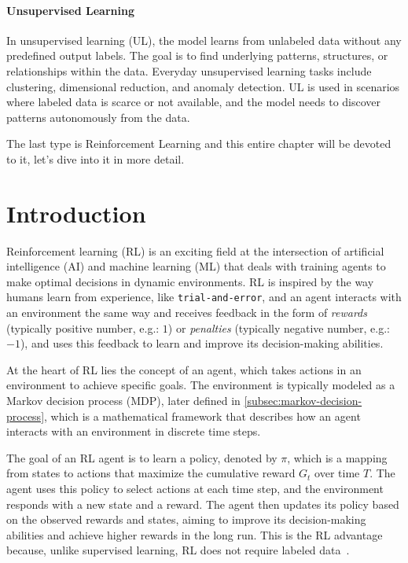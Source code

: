 \documentclass[../xlapes02]{subfiles}
\begin{document}
    \paragraph{Unsupervised Learning}
    In unsupervised learning (UL), the model learns from unlabeled data without any predefined output labels. The goal is to find underlying patterns, structures, or relationships within the data. Everyday unsupervised learning tasks include clustering, dimensional reduction, and anomaly detection. UL is used in scenarios where labeled data is scarce or not available, and the model needs to discover patterns autonomously from the data.

    The last type is Reinforcement Learning and this entire chapter will be devoted to it, let's dive into it in more detail.


    \section{Introduction}\label{sec:rl-introduction}
    Reinforcement learning (RL) is an exciting field at the intersection of artificial intelligence (AI) and machine learning (ML) that deals with training agents to make optimal decisions in dynamic environments. RL is inspired by the way humans learn from experience, like \texttt{trial-and-error}, and an agent interacts with an environment the same way and receives feedback in the form of \emph{rewards} (typically positive number, e.g.: $1$) or \emph{penalties} (typically negative number, e.g.: $-1$), and uses this feedback to learn and improve its decision-making abilities.

    At the heart of RL lies the concept of an agent, which takes actions in an environment to achieve specific goals. The environment is typically modeled as a Markov decision process (MDP), later defined in \cref{subsec:markov-decision-process}, which is a mathematical framework that describes how an agent interacts with an environment in discrete time steps.

    The goal of an RL agent is to learn a policy, denoted by $\pi$, which is a mapping from states to actions that maximize the cumulative reward $G_t$ over time $T$. The agent uses this policy to select actions at each time step, and the environment responds with a new state and a reward. The agent then updates its policy based on the observed rewards and states, aiming to improve its decision-making abilities and achieve higher rewards in the long run. This is the RL advantage because, unlike supervised learning, RL does not require labeled data~\cite{rl-course-david-silver}.
\end{document}
